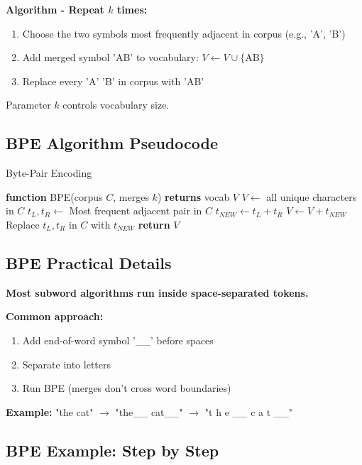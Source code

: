 \documentclass[11pt,a4paper]{article}
\theoremstyle{definition}
\theoremstyle{plain}
\theoremstyle{remark}
\begin{document}
\textbf{Algorithm - Repeat $k$ times:}
\begin{enumerate}
    \item Choose the two symbols most frequently adjacent in corpus (e.g., 'A', 'B')
    \item Add merged symbol 'AB' to vocabulary: $V \leftarrow V \cup \{\text{AB}\}$
    \item Replace every 'A' 'B' in corpus with 'AB'
\end{enumerate}

Parameter $k$ controls vocabulary size.

\subsection{BPE Algorithm Pseudocode}

\begin{algorithm}
\caption{Byte-Pair Encoding}
\begin{algorithmic}
\STATE \textbf{function} BPE(corpus $C$, merges $k$) \textbf{returns} vocab $V$
\STATE $V \leftarrow$ all unique characters in $C$
    \STATE $t_L, t_R \leftarrow$ Most frequent adjacent pair in $C$
    \STATE $t_{NEW} \leftarrow t_L + t_R$
    \STATE $V \leftarrow V + t_{NEW}$
    \STATE Replace $t_L, t_R$ in $C$ with $t_{NEW}$
\ENDFOR
\STATE \textbf{return} $V$
\end{algorithmic}
\end{algorithm}

\subsection{BPE Practical Details}

\textbf{Most subword algorithms run inside space-separated tokens.}

\textbf{Common approach:}
\begin{enumerate}
    \item Add end-of-word symbol '\_\_' before spaces
    \item Separate into letters
    \item Run BPE (merges don't cross word boundaries)
\end{enumerate}

\textbf{Example:} "the cat" $\rightarrow$ "the\_\_ cat\_\_" $\rightarrow$ "t h e \_\_ c a t \_\_"

\subsection{BPE Example: Step by Step}
\end{document}
